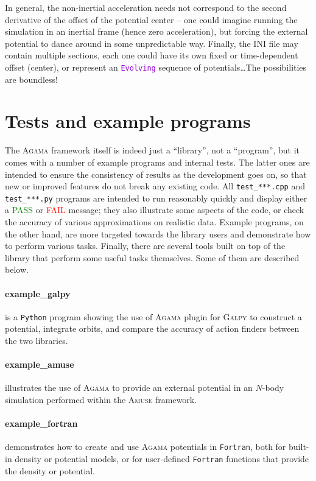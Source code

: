 \documentclass[12pt]{article}
\newcommand{\Agama}{\textsc{Agama}\xspace}
\newcommand{\Amuse}{\textsc{Amuse}\xspace}
\newcommand{\Galpy}{\textsc{Galpy}\xspace}
\newcommand{\Python}{\texttt{Python}\xspace}
\newcommand{\Fortran}{\texttt{Fortran}\xspace}
\newcommand{\ttt}[1]{\textcolor{darkviolet}{\texttt{#1}}}
\begin{document}
In general, the non-inertial acceleration needs not correspond to the second derivative of the offset of the potential center -- one could imagine running the simulation in an inertial frame (hence zero acceleration), but forcing the external potential to dance around in some unpredictable way. Finally, the INI file may contain multiple sections, each one could have its own fixed or time-dependent offset (center), or represent an \ttt{Evolving} sequence of potentials\dots The possibilities are boundless!


\section{Tests and example programs}  \label{sec:ExamplesTests}

The \Agama framework itself is indeed just a ``library'', not a ``program'', but it comes with a number of example programs and internal tests. The latter ones are intended to ensure the consistency of results as the development goes on, so that new or improved features do not break any existing code. All \texttt{test_***.cpp} and \texttt{test_***.py} programs are intended to run reasonably quickly and display either a \textcolor{Green}{PASS} or \textcolor{Red}{FAIL} message; they also illustrate some aspects of the code, or check the accuracy of various approximations on realistic data. Example programs, on the other hand, are more targeted towards the library users and demonstrate how to perform various tasks. Finally, there are several tools built on top of the library that perform some useful tasks themselves. Some of them are described below.

\paragraph{example_galpy} is a \Python program showing the use of \Agama plugin for \Galpy to construct a potential, integrate orbits, and compare the accuracy of action finders between the two libraries. 

\paragraph{example_amuse} illustrates the use of \Agama to provide an external potential in an $N$-body simulation performed within the \Amuse framework.

\paragraph{example_fortran} demonstrates how to create and use \Agama potentials in \Fortran, both for built-in density or potential models, or for user-defined \Fortran functions that provide the density or potential.
\end{document}
